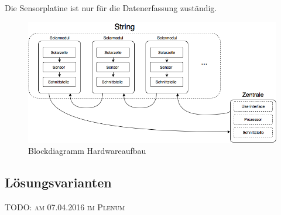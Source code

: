 Die Sensorplatine ist nur f\"ur die Datenerfassung zust\"andig.

\begin{figure}[h!]
    \centering
    \includegraphics[width=.9\textwidth]{images/blockdiag.png}
    \caption{Blockdiagramm Hardwareaufbau}
    \label{fig:blockdiag:hardware}
\end{figure}


\subsection{L\"osungsvarianten}
\textsc{TODO: am 07.04.2016 im Plenum}


